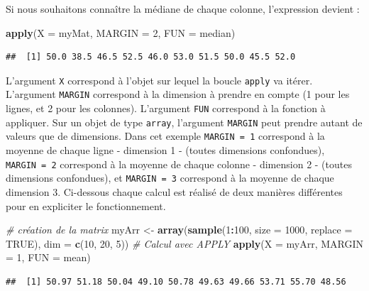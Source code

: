 \documentclass[
]{book}
\newenvironment{Shaded}{\begin{snugshade}}{\end{snugshade}}
\newcommand{\CommentTok}[1]{\textcolor[rgb]{0.56,0.35,0.01}{\textit{#1}}}
\newcommand{\DataTypeTok}[1]{\textcolor[rgb]{0.13,0.29,0.53}{#1}}
\newcommand{\DecValTok}[1]{\textcolor[rgb]{0.00,0.00,0.81}{#1}}
\newcommand{\KeywordTok}[1]{\textcolor[rgb]{0.13,0.29,0.53}{\textbf{#1}}}
\newcommand{\NormalTok}[1]{#1}
\newcommand{\OperatorTok}[1]{\textcolor[rgb]{0.81,0.36,0.00}{\textbf{#1}}}
\newcommand{\OtherTok}[1]{\textcolor[rgb]{0.56,0.35,0.01}{#1}}
\newcommand{\StringTok}[1]{\textcolor[rgb]{0.31,0.60,0.02}{#1}}
\begin{document}
Si nous souhaitons connaître la médiane de chaque colonne, l'expression devient :

\begin{Shaded}
\begin{Highlighting}[]
\KeywordTok{apply}\NormalTok{(}\DataTypeTok{X =}\NormalTok{ myMat, }\DataTypeTok{MARGIN =} \DecValTok{2}\NormalTok{, }\DataTypeTok{FUN =}\NormalTok{ median)}
\end{Highlighting}
\end{Shaded}

\begin{verbatim}
##  [1] 50.0 38.5 46.5 52.5 46.0 53.0 51.5 50.0 45.5 52.0
\end{verbatim}

L'argument \texttt{X} correspond à l'objet sur lequel la boucle \texttt{apply} va itérer. L'argument \texttt{MARGIN} correspond à la dimension à prendre en compte (1 pour les lignes, et 2 pour les colonnes). L'argument \texttt{FUN} correspond à la fonction à appliquer. Sur un objet de type \texttt{array}, l'argument \texttt{MARGIN} peut prendre autant de valeurs que de dimensions. Dans cet exemple \texttt{MARGIN\ =\ 1} correspond à la moyenne de chaque ligne - dimension 1 - (toutes dimensions confondues), \texttt{MARGIN\ =\ 2} correspond à la moyenne de chaque colonne - dimension 2 - (toutes dimensions confondues), et \texttt{MARGIN\ =\ 3} correspond à la moyenne de chaque dimension 3. Ci-dessous chaque calcul est réalisé de deux manières différentes pour en expliciter le fonctionnement.

\begin{Shaded}
\begin{Highlighting}[]
\CommentTok{# création de la matrix}
\NormalTok{myArr <-}\StringTok{ }\KeywordTok{array}\NormalTok{(}\KeywordTok{sample}\NormalTok{(}\DecValTok{1}\OperatorTok{:}\DecValTok{100}\NormalTok{, }\DataTypeTok{size =} \DecValTok{1000}\NormalTok{, }\DataTypeTok{replace =} \OtherTok{TRUE}\NormalTok{), }\DataTypeTok{dim =} \KeywordTok{c}\NormalTok{(}\DecValTok{10}\NormalTok{, }\DecValTok{20}\NormalTok{, }\DecValTok{5}\NormalTok{))}
\CommentTok{# Calcul avec APPLY}
\KeywordTok{apply}\NormalTok{(}\DataTypeTok{X =}\NormalTok{ myArr, }\DataTypeTok{MARGIN =} \DecValTok{1}\NormalTok{, }\DataTypeTok{FUN =}\NormalTok{ mean)}
\end{Highlighting}
\end{Shaded}

\begin{verbatim}
##  [1] 50.97 51.18 50.04 49.10 50.78 49.63 49.66 53.71 55.70 48.56
\end{verbatim}
\end{document}
